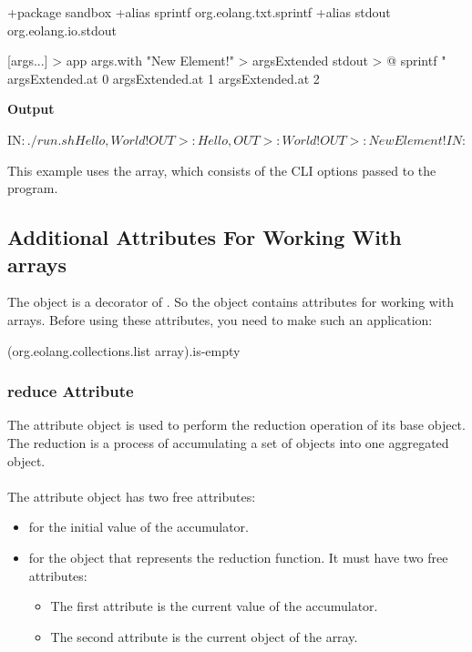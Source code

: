 \documentclass[12pt]{book}
\begin{document}
{{{\begin{ffcode}
+package sandbox
+alias sprintf org.eolang.txt.sprintf
+alias stdout org.eolang.io.stdout

[args...] > app
  args.with "New Element!" > argsExtended
  stdout > @
    sprintf
      "%
      argsExtended.at 0
      argsExtended.at 1
      argsExtended.at 2

\end{ffcode}
\textbf{Output}
\begin{ffcode}
IN$: ./run.sh Hello, World!
OUT>: Hello,
OUT>: World!
OUT>: New Element!
IN$: 
\end{ffcode}

This example uses the  array, which consists of the CLI options passed to the program.

\subsection{Additional Attributes For Working With arrays}

The object  is a decorator of . So the  object contains attributes for working with arrays. Before using these attributes, you need to make such an application:
\begin{ffcode}
    (org.eolang.collections.list array).is-empty
\end{ffcode}

\subsubsection{reduce Attribute}
The  attribute object is used to perform the reduction operation of its base  object. The reduction is a process of accumulating a set of objects into one aggregated object.
\\
\\
The  attribute object has two free attributes:
\begin{itemize}
    \item {} for the initial value of the accumulator.
    \item {} for the object that represents the reduction function. It must have two free attributes:
    \begin{itemize}
        \item The first attribute is the current value of the accumulator.
        \item The second attribute is the current object of the array.
    \end{itemize}
\end{itemize}

}}}
\end{document}
